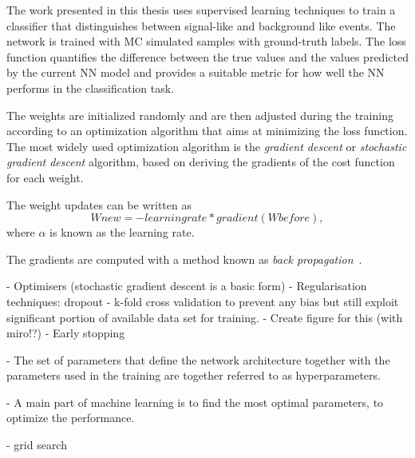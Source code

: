 The work presented in this thesis uses supervised learning techniques to train a classifier that distinguishes between signal-like and background like events. 
The network is trained with MC simulated samples with ground-truth labels. 
The loss function quantifies the difference between the true values and the values predicted by the current NN model and provides a suitable metric for how well the NN performs in the classification task.

The weights are initialized randomly and are then adjusted during the training according to an optimization algorithm that aims at minimizing the loss function.
The most widely used optimization algorithm is the \emph{gradient descent} or \emph{stochastic gradient descent} algorithm, based on deriving the gradients of the cost function for each weight.

The weight updates can be written as 
\begin{equation}
    Wnew = - learning rate * gradient(Wbefore), 
\end{equation}
where $\alpha$ is known as the learning rate. 

The gradients are computed with a method known as \emph{back propagation}~.


- Optimisers (stochastic gradient descent is a basic form)
- Regularisation techniques: dropout
- k-fold cross validation to prevent any bias but still exploit significant portion of available data set for training.
- Create figure for this (with miro!?)
- Early stopping

- The set of parameters that define the network architecture together with the parameters used in the training are together referred to as hyperparameters.

- A main part of machine learning is to find the most optimal parameters, to optimize the performance.

- grid search

